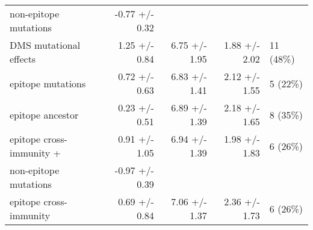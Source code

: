 \begin{tabular*}{1.0\textwidth}{lrrrl}
 \hspace{3mm}non-epitope mutations &  -0.77 +/- 0.32 &                                        &                                                 &                                         \\
            DMS mutational effects &   1.25 +/- 0.84 &                          6.75 +/- 1.95 &                                   1.88 +/- 2.02 &                               11 (48\%) \\
                 epitope mutations &   0.72 +/- 0.63 &                          6.83 +/- 1.41 &                                   2.12 +/- 1.55 &                                5 (22\%) \\
                  epitope ancestor &   0.23 +/- 0.51 &                          6.89 +/- 1.39 &                                   2.18 +/- 1.65 &                                8 (35\%) \\
          epitope cross-immunity + &   0.91 +/- 1.05 &                          6.94 +/- 1.39 &                                   1.98 +/- 1.83 &                                6 (26\%) \\
 \hspace{3mm}non-epitope mutations &  -0.97 +/- 0.39 &                                        &                                                 &                                         \\
            epitope cross-immunity &   0.69 +/- 0.84 &                          7.06 +/- 1.37 &                                   2.36 +/- 1.73 &                                6 (26\%) \\
\bottomrule
\end{tabular*}
